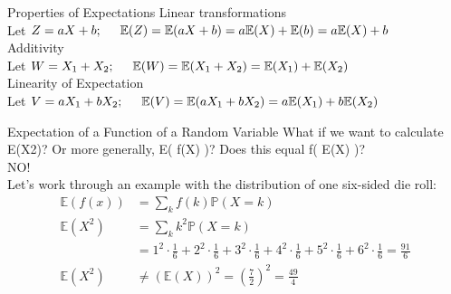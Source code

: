 \documentclass[aspectratio=169]{../latex_main/tntbeamer}  %
\begin{document}
	\begin{frame}[c]{Properties of Expectations}
	    Linear transformations\\
	    Let $Z = aX + b;\hspace{5mm} \mathbb{E}(Z) = \mathbb{E}( aX + b) = a\mathbb{E}(X) + \mathbb{E}(b) = a\mathbb{E}(X) + b$\\
	    \bigskip
	    Additivity\\
	    Let $W = X_1 + X_2; \hspace{5mm} \mathbb{E}(W) = \mathbb{E}( X_1 + X_2) =  \mathbb{E}( X_1) + \mathbb{E}(X_2)$\\
	    \bigskip
	    Linearity of Expectation\\
	    Let $V = aX_1 + bX_2;\hspace{5mm} \mathbb{E}(V) = \mathbb{E}( aX_1 + bX_2) = a\mathbb{E}(X_1) + b\mathbb{E}(X_2)  $
	\end{frame}
	
	
	\begin{frame}[c]{Expectation of a Function of a Random Variable}
	    What if we want to calculate E(X2)? Or more generally, E( f(X) )? Does this equal f( E(X) )?\\
	    NO!\\
	    Let’s work through an example with the distribution of one six-sided die roll:
	    \begin{align*}
	        \mathbb{E}(f(x)) &= \sum\limits_kf(k)\mathbb{P}(X=k)\\
	        \mathbb{E}(X^2) &= \sum\limits_kk^2\mathbb{P}(X=k)\\
	        &= 1^2\cdot \frac{1}{6} + 2^2\cdot \frac{1}{6} + 3^2\cdot \frac{1}{6} + 4^2\cdot \frac{1}{6} +  5^2\cdot \frac{1}{6} + 6^2\cdot \frac{1}{6} = \frac{91}{6}\\
	        \mathbb{E}(X^2) &\neq (\mathbb{E}(X))^2 = \left(\frac{7}{2}\right)^2 = \frac{49}{4}
	    \end{align*}
	\end{frame}
	
\end{document}

